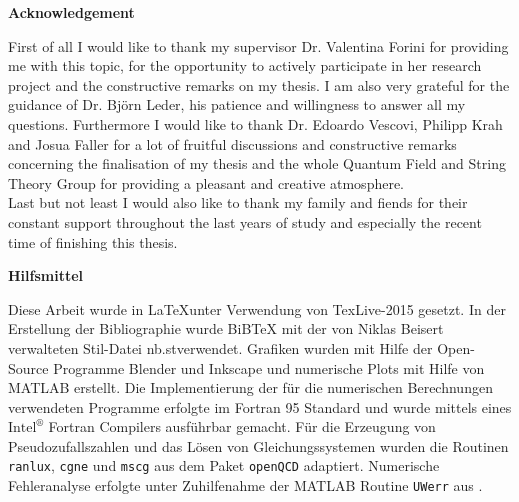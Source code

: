 \begin{center}
{\sffamily \bfseries\Large Acknowledgement}\\
\end{center}%
\vspace{1cm}
%
First of all I would like to thank my supervisor Dr. Valentina Forini for providing me with this topic, for the opportunity to actively participate in her research project and the constructive remarks on my thesis. I am also very grateful for the guidance of Dr. Björn Leder, his patience and willingness to answer all my questions. Furthermore I would like to thank Dr. Edoardo Vescovi, Philipp Krah and Josua Faller for a lot of fruitful discussions and constructive remarks concerning the finalisation of my thesis and the whole Quantum Field and String Theory Group for providing a pleasant and creative atmosphere.\\
Last but not least I would also like to thank my family and fiends for their constant support throughout the last years of study and especially the recent time of finishing this thesis.\\
%
%
%
\vspace{3cm}
%
\begin{center}
{\sffamily \bfseries\Large Hilfsmittel}\\
\end{center}%
\vspace{1cm}
Diese Arbeit wurde in \LaTeX unter Verwendung von TexLive-2015 gesetzt. In der Erstellung der Bibliographie wurde BiBTeX mit der von Niklas Beisert verwalteten Stil-Datei \glqq nb.st\grqq{ }verwendet. Grafiken wurden mit Hilfe der Open-Source Programme Blender und Inkscape und numerische Plots mit Hilfe von MATLAB erstellt. Die Implementierung der für die numerischen Berechnungen verwendeten Programme erfolgte im {\sc Fortran 95} Standard und wurde mittels eines $\text{Intel}^{\circledR}$ Fortran Compilers ausführbar gemacht. Für die Erzeugung von Pseudozufallszahlen und das Lösen von Gleichungssystemen wurden die Routinen \texttt{ranlux}, \texttt{cgne} und \texttt{mscg} aus dem Paket \texttt{openQCD} adaptiert. Numerische Fehleranalyse erfolgte unter Zuhilfenahme der MATLAB Routine \texttt{UWerr} aus \cite{Wolff:2003sm}.